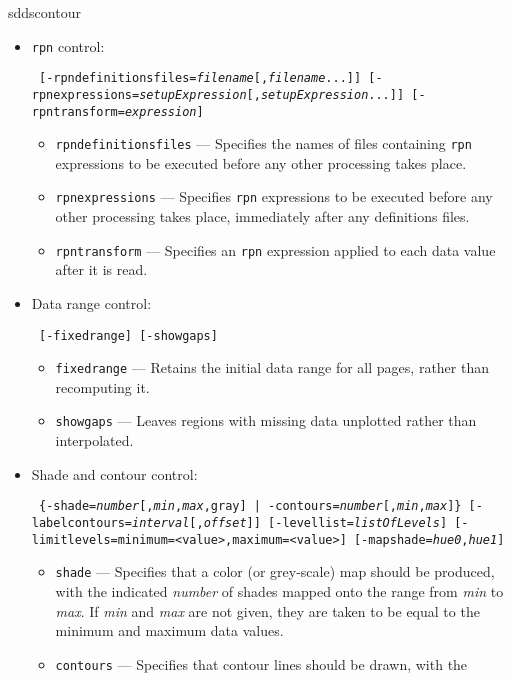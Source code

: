 \begin{sddsprog}{sddscontour}
\begin{itemize}
    \item \verb|rpn| control:
\begin{flushleft}{\tt
[-rpndefinitionsfiles={\em filename}[,{\em filename}...]]
[-rpnexpressions={\em setupExpression}[,{\em setupExpression}...]]
[-rpntransform={\em expression}]
}\end{flushleft}
        \begin{itemize}
        \item \verb|rpndefinitionsfiles| --- Specifies the names of files containing \verb|rpn| expressions
        to be executed before any other processing takes place.
        \item \verb|rpnexpressions| --- Specifies \verb|rpn| expressions to be executed before any other processing
         takes place, immediately after any definitions files.
        \item \verb|rpntransform| --- Specifies an \verb|rpn| expression applied to each data value after it is read.
        \end{itemize}
    \item Data range control:
\begin{flushleft}{\tt
[-fixedrange] [-showgaps]
}\end{flushleft}
        \begin{itemize}
        \item \verb|fixedrange| --- Retains the initial data range for all pages, rather than recomputing it.
        \item \verb|showgaps| --- Leaves regions with missing data unplotted rather than interpolated.
        \end{itemize}
    \item Shade and contour control:
\begin{flushleft}{\tt
\{-shade={\em number}[,{\em min},{\em max},gray] | -contours={\em number}[,{\em min},{\em max}]\}
[-labelcontours={\em interval}[,{\em offset}]]
[-levellist={\em listOfLevels}] [-limitlevels={minimum=<value>,}{maximum=<value>}]
[-mapshade={\em hue0},{\em hue1}]
}\end{flushleft}
        \begin{itemize}
        \item \verb|shade| --- Specifies that a color (or grey-scale) map should be produced, with the
        indicated {\em number} of shades mapped onto the range from {\em min} to {\em max}.  If {\em min}
        and {\em max} are not given, they are taken to be equal to the minimum and maximum data values.
        \item \verb|contours| --- Specifies that contour lines should be drawn, with the

\end{itemize}
\end{itemize}
\end{sddsprog}
